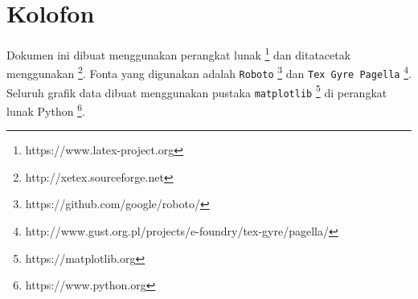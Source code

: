 \markboth{}{}
\section*{Kolofon}
Dokumen ini dibuat menggunakan perangkat lunak \LaTeXe \footnote{https://www.latex-project.org} dan ditatacetak menggunakan \XeLaTeX \footnote{http://xetex.sourceforge.net}. Fonta yang digunakan adalah \texttt{Roboto} \footnote{https://github.com/google/roboto/} dan \texttt{Tex Gyre Pagella} \footnote{http://www.gust.org.pl/projects/e-foundry/tex-gyre/pagella/}. Seluruh grafik data dibuat menggunakan pustaka \texttt{matplotlib} \footnote{https://matplotlib.org} di perangkat lunak Python \footnote{https://www.python.org}. 
